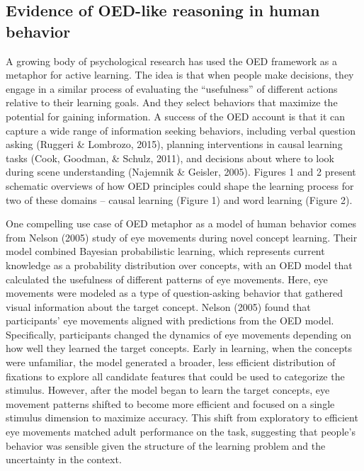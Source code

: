 \documentclass[oneside]{report}
\begin{document}
\hypertarget{evidence-of-oed-like-reasoning-in-human-behavior}{%
\subsection{Evidence of OED-like reasoning in human
behavior}\label{evidence-of-oed-like-reasoning-in-human-behavior}}

A growing body of psychological research has used the OED framework as a
metaphor for active learning. The idea is that when people make
decisions, they engage in a similar process of evaluating the
``usefulness'' of different actions relative to their learning goals.
And they select behaviors that maximize the potential for gaining
information. A success of the OED account is that it can capture a wide
range of information seeking behaviors, including verbal question asking
(Ruggeri \& Lombrozo, 2015), planning interventions in causal learning
tasks (Cook, Goodman, \& Schulz, 2011), and decisions about where to
look during scene understanding (Najemnik \& Geisler, 2005). Figures 1
and 2 present schematic overviews of how OED principles could shape the
learning process for two of these domains -- causal learning (Figure 1)
and word learning (Figure 2).

One compelling use case of OED metaphor as a model of human behavior
comes from Nelson (2005) study of eye movements during novel concept
learning. Their model combined Bayesian probabilistic learning, which
represents current knowledge as a probability distribution over
concepts, with an OED model that calculated the usefulness of different
patterns of eye movements. Here, eye movements were modeled as a type of
question-asking behavior that gathered visual information about the
target concept. Nelson (2005) found that participants' eye movements
aligned with predictions from the OED model. Specifically, participants
changed the dynamics of eye movements depending on how well they learned
the target concepts. Early in learning, when the concepts were
unfamiliar, the model generated a broader, less efficient distribution
of fixations to explore all candidate features that could be used to
categorize the stimulus. However, after the model began to learn the
target concepts, eye movement patterns shifted to become more efficient
and focused on a single stimulus dimension to maximize accuracy. This
shift from exploratory to efficient eye movements matched adult
performance on the task, suggesting that people's behavior was sensible
given the structure of the learning problem and the uncertainty in the
context.
\end{document}
